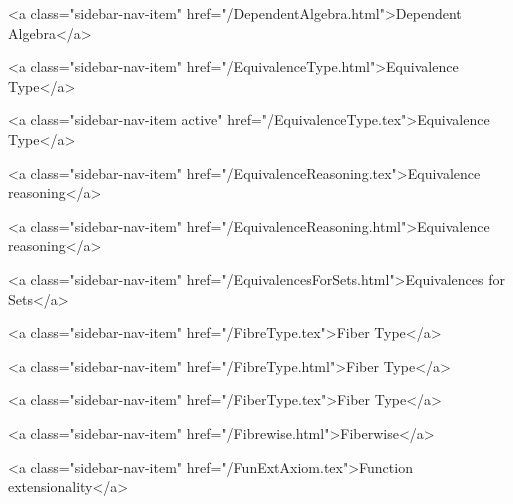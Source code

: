       
        
          <a class="sidebar-nav-item" href="/DependentAlgebra.html">Dependent Algebra</a>
        
      
    
      
        
          <a class="sidebar-nav-item" href="/EquivalenceType.html">Equivalence Type</a>
        
      
    
      
        
          <a class="sidebar-nav-item active" href="/EquivalenceType.tex">Equivalence Type</a>
        
      
    
      
        
          <a class="sidebar-nav-item" href="/EquivalenceReasoning.tex">Equivalence reasoning</a>
        
      
    
      
        
          <a class="sidebar-nav-item" href="/EquivalenceReasoning.html">Equivalence reasoning</a>
        
      
    
      
        
          <a class="sidebar-nav-item" href="/EquivalencesForSets.html">Equivalences for Sets</a>
        
      
    
      
        
          <a class="sidebar-nav-item" href="/FibreType.tex">Fiber Type</a>
        
      
    
      
        
          <a class="sidebar-nav-item" href="/FibreType.html">Fiber Type</a>
        
      
    
      
        
          <a class="sidebar-nav-item" href="/FiberType.tex">Fiber Type</a>
        
      
    
      
        
          <a class="sidebar-nav-item" href="/Fibrewise.html">Fiberwise</a>
        
      
    
      
        
          <a class="sidebar-nav-item" href="/FunExtAxiom.tex">Function extensionality</a>
        
